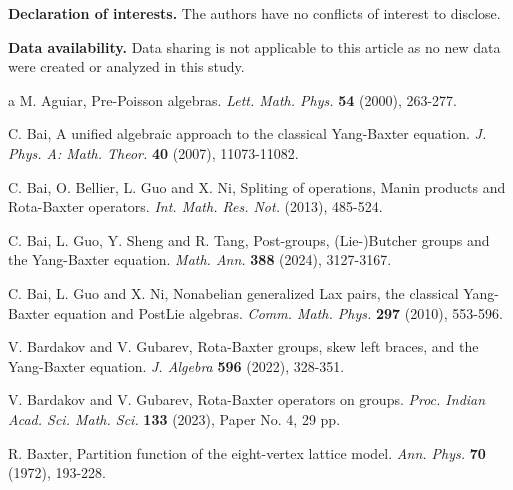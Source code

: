 \documentclass[12pt]{amsart}
\theoremstyle{definition}   %
\begin{document}
\noindent
{\bf Declaration of interests. } The authors have no conflicts of interest to disclose.

\noindent
{\bf Data availability. } Data sharing is not applicable to this article as no new data were created or analyzed in this study.

\begin{thebibliography}{a}
M. Aguiar, Pre-Poisson algebras. {\em Lett. Math. Phys.} {\bf54} (2000),  263-277.

C. Bai, A unified algebraic approach to the classical Yang-Baxter equation. \emph{J. Phys. A: Math. Theor.} {\bf 40} (2007), 11073-11082.

 C. Bai, O. Bellier, L. Guo and X. Ni, Spliting of operations, Manin products and Rota-Baxter operators.  {\em Int. Math. Res. Not.} (2013), 485-524.
		
C. Bai, L. Guo, Y. Sheng  and R. Tang, Post-groups, (Lie-)Butcher groups and the Yang-Baxter equation. \emph{Math. Ann.} {\bf388} (2024), 3127-3167.



C. Bai, L. Guo and X. Ni,  Nonabelian generalized Lax pairs, the classical Yang-Baxter equation and PostLie algebras. \emph{Comm. Math. Phys.} {\bf297} (2010), 553-596.

V.  Bardakov and V. Gubarev, Rota-Baxter groups, skew left braces, and the Yang-Baxter equation. \emph{J. Algebra} {\bf596} (2022), 328-351.

 V.  Bardakov and  V. Gubarev, Rota-Baxter operators on groups. \emph{Proc. Indian Acad. Sci. Math. Sci.} {\bf133} (2023), Paper No. 4, 29 pp.


R.  Baxter, Partition function of the eight-vertex lattice model. \emph{Ann. Phys.} {\bf70} (1972), 193-228.





\end{thebibliography}
\end{document}

